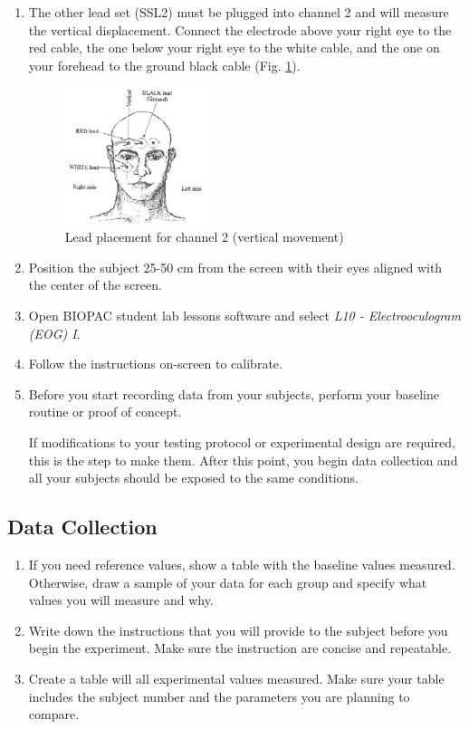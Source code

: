 \documentclass{article}
\begin{document}
\begin{enumerate}
	\item The other lead set (SSL2) must be plugged into channel 2 and will measure the vertical displacement. Connect the electrode above your right eye to the red cable, the one below your right eye to the white cable, and the one on your forehead to the ground black cable (Fig. \ref{setup3}).
	
	\begin{figure}[h]
	\centering\includegraphics[width=0.4\textwidth]{../images/EOG_4.jpg}
	\caption{Lead placement for channel 2 (vertical movement)}
	\label{setup3}
	\end{figure}
	
	\item Position the subject 25-50 cm from the screen with their eyes aligned with the center of the screen.
	\item Open BIOPAC student lab lessons software and select \textit{L10 - Electrooculogram (EOG) I}.
	\item Follow the instructions on-screen to calibrate.
	\item Before you start recording data from your subjects, perform your baseline routine or proof of concept.
	
	\begin{info}
		If modifications to your testing protocol or experimental design are required, this is the step to make them. After this point, you begin data collection and all your subjects should be exposed to the same conditions.
	\end{info}
\end{enumerate}

\subsection*{Data Collection}
\begin{enumerate}
	\item If you need reference values, show a table with the baseline values measured. Otherwise, draw a sample of your data for each group and specify what values you will measure and why.
	\item Write down the instructions that you will provide to the subject before you begin the experiment. Make sure the instruction are concise and repeatable.
	\item Create a table will all experimental values measured. Make sure your table includes the subject number and the parameters you are planning to compare.
\end{enumerate}
\end{document}
